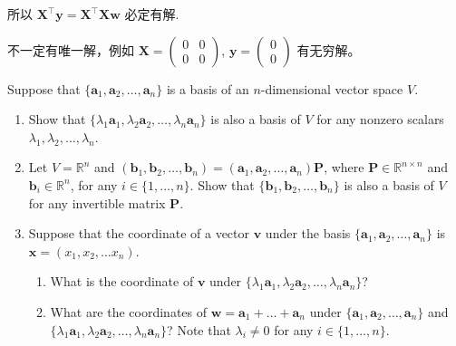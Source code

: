 \documentclass[11pt,letter,notitlepage]{article}
\begin{document}
\begin{solution}
\begin{enumerate}
              所以 $\mathbf{X}^\top\mathbf{y}=\mathbf{X}^\top\mathbf{X}\mathbf{w}$ 必定有解.

              不一定有唯一解，例如 $\mathbf{X}=\begin{pmatrix}
                      0 & 0 \\ 0 & 0
                  \end{pmatrix}$, $\mathbf{y}=\begin{pmatrix}
                      0 \\ 0
                  \end{pmatrix}$ 有无穷解。
    \end{enumerate}
\end{solution}

\newpage


\begin{exercise}

    Suppose that $\{\mathbf{a}_1, \mathbf{a}_2,\dots,\mathbf{a}_n\}$ is a basis of an $n$-dimensional vector space $V$.
    \begin{enumerate}
        \item Show that $\{\lambda_1 \mathbf{a}_1, \lambda_2 \mathbf{a}_2, \dots, \lambda_n\mathbf{a}_n\}$ is also a basis of $V$ for any nonzero scalars $\lambda_1,\lambda_2, \dots, \lambda_n$.
        \item Let $V =\mathbb{R}^n$ and  $(\mathbf{b}_1,\mathbf{b}_2,\dots, \mathbf{b}_n) = (\mathbf{a}_1,\mathbf{a}_2, \dots, \mathbf{a}_n)\mathbf{P}$, where $\mathbf{P}\in \mathbb{R}^{n\times n}$ and $\mathbf{b}_i\in \mathbb{R}^n$, for any $i\in\{1,\dots,n\}$. Show that $\{ \mathbf{b}_1, \mathbf{b}_2, \dots, \mathbf{b}_n\}$ is also a basis of $V$ for any invertible  matrix $\mathbf{P}$.
        \item Suppose that the coordinate of a vector $\mathbf{v}$ under the basis $\{\mathbf{a}_1,  \mathbf{a}_2,\dots,\mathbf{a}_n\}$ is $\mathbf{x}=(x_1,x_2,\dots x_n)$.
              \begin{enumerate}
                  \item What is the coordinate of $\mathbf{v}$ under $\{\lambda_1 \mathbf{a}_1, \lambda_2 \mathbf{a}_2, \dots, \lambda_n\mathbf{a}_n\}$?

                  \item What are the coordinates of $\mathbf{w} = \mathbf{a}_1+\dots + \mathbf{a}_n$ under $\{\mathbf{a}_1, \mathbf{a}_2,\dots,\mathbf{a}_n\}$ and $\{\lambda_1 \mathbf{a}_1, \lambda_2 \mathbf{a}_2, \dots, \lambda_n\mathbf{a}_n\}$? Note that  $\lambda_i \neq 0$ for any $i\in \{1,\dots,n\}$.
              \end{enumerate}
    \end{enumerate}
\end{exercise}
\end{document}
